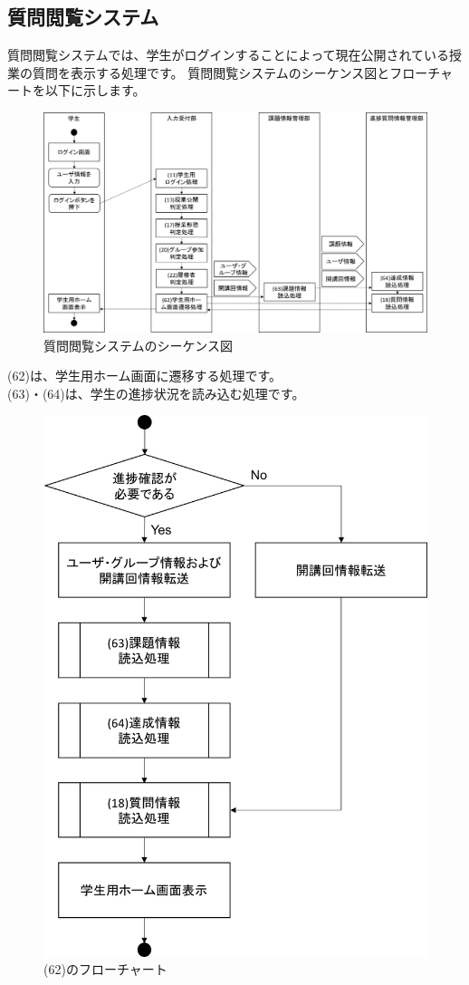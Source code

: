 \clearpage


\subsection{質問閲覧システム}
質問閲覧システムでは、学生がログインすることによって現在公開されている授業の質問を表示する処理です。
質問閲覧システムのシーケンス図とフローチャートを以下に示します。


\begin{figure}[htbp]
  \begin{center}
    \includegraphics[width=1\linewidth,clip]{./img/seq16.png}
    \caption{質問閲覧システムのシーケンス図}\label{fig:seq16}
  \end{center}
\end{figure}

(62)は、学生用ホーム画面に遷移する処理です。\\
(63)・(64)は、学生の進捗状況を読み込む処理です。

\begin{figure}[htbp]
  \begin{center}
   \includegraphics[width=0.5\linewidth,clip]{./img/flow/62.png}
  \end{center}
 \caption{(62)のフローチャート}\label{fig:62}
\end{figure}

